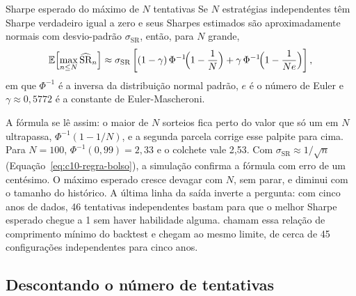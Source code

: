 \begin{resultado}{Sharpe esperado do máximo de $N$ tentativas}
Se $N$ estratégias independentes têm Sharpe verdadeiro igual a zero e seus Sharpes estimados são aproximadamente normais com desvio-padrão $\sigma_{\text{SR}}$, então, para $N$ grande,
\begin{equation}
  \operatorname{\mathbb{E}}\Bigl[\max_{n \le N} \widehat{\text{SR}}_n\Bigr] \approx \sigma_{\text{SR}}
  \left[(1-\gamma)\,\Phi^{-1}\!\Bigl(1 - \frac{1}{N}\Bigr) + \gamma\,\Phi^{-1}\!\Bigl(1 - \frac{1}{N e}\Bigr)\right] ,
  \label{eq:c10-maximo}
\end{equation}
em que $\Phi^{-1}$ é a inversa da distribuição normal padrão, $e$ é o número de Euler e $\gamma \approx 0,5772$ é a constante de Euler-Mascheroni.
\end{resultado}

A fórmula se lê assim: o maior de $N$ sorteios fica perto do valor que só um em $N$ ultrapassa, $\Phi^{-1}(1 - 1/N)$, e a segunda parcela corrige esse palpite para cima. Para $N = 100$, $\Phi^{-1}(0,99) = 2,33$ e o colchete vale 2,53. Com $\sigma_{\text{SR}} \approx 1/\sqrt{n}$ (Equação~\eqref{eq:c10-regra-bolso}), a simulação confirma a fórmula com erro de um centésimo. O máximo esperado cresce devagar com $N$, sem parar, e diminui com o tamanho do histórico. A última linha da saída inverte a pergunta: com cinco anos de dados, 46 tentativas independentes bastam para que o melhor Sharpe esperado chegue a 1 sem haver habilidade alguma. \citet{bailey2014pseudo} chamam essa relação de comprimento mínimo do backtest e chegam ao mesmo limite, de cerca de 45 configurações independentes para cinco anos.

\subsection{Descontando o número de tentativas}

